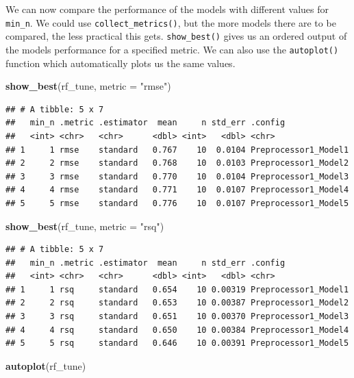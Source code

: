\documentclass[
]{book}
\newenvironment{Shaded}{\begin{snugshade}}{\end{snugshade}}
\newcommand{\AttributeTok}[1]{\textcolor[rgb]{0.13,0.29,0.53}{#1}}
\newcommand{\FunctionTok}[1]{\textcolor[rgb]{0.13,0.29,0.53}{\textbf{#1}}}
\newcommand{\NormalTok}[1]{#1}
\newcommand{\StringTok}[1]{\textcolor[rgb]{0.31,0.60,0.02}{#1}}
\begin{document}
We can now compare the performance of the models with different values for
\texttt{min\_n}. We could use \texttt{collect\_metrics()}, but the more models there are to be
compared, the less practical this gets. \texttt{show\_best()} gives us an ordered output
of the models performance for a specified metric. We can also use the
\texttt{autoplot()} function which automatically plots us the same values.

\begin{Shaded}
\begin{Highlighting}[]
\FunctionTok{show\_best}\NormalTok{(rf\_tune, }\AttributeTok{metric =} \StringTok{"rmse"}\NormalTok{)}
\end{Highlighting}
\end{Shaded}

\begin{verbatim}
## # A tibble: 5 x 7
##   min_n .metric .estimator  mean     n std_err .config             
##   <int> <chr>   <chr>      <dbl> <int>   <dbl> <chr>               
## 1     1 rmse    standard   0.767    10  0.0104 Preprocessor1_Model1
## 2     2 rmse    standard   0.768    10  0.0103 Preprocessor1_Model2
## 3     3 rmse    standard   0.770    10  0.0104 Preprocessor1_Model3
## 4     4 rmse    standard   0.771    10  0.0107 Preprocessor1_Model4
## 5     5 rmse    standard   0.776    10  0.0107 Preprocessor1_Model5
\end{verbatim}

\begin{Shaded}
\begin{Highlighting}[]
\FunctionTok{show\_best}\NormalTok{(rf\_tune, }\AttributeTok{metric =} \StringTok{"rsq"}\NormalTok{)}
\end{Highlighting}
\end{Shaded}

\begin{verbatim}
## # A tibble: 5 x 7
##   min_n .metric .estimator  mean     n std_err .config             
##   <int> <chr>   <chr>      <dbl> <int>   <dbl> <chr>               
## 1     1 rsq     standard   0.654    10 0.00319 Preprocessor1_Model1
## 2     2 rsq     standard   0.653    10 0.00387 Preprocessor1_Model2
## 3     3 rsq     standard   0.651    10 0.00370 Preprocessor1_Model3
## 4     4 rsq     standard   0.650    10 0.00384 Preprocessor1_Model4
## 5     5 rsq     standard   0.646    10 0.00391 Preprocessor1_Model5
\end{verbatim}

\begin{Shaded}
\begin{Highlighting}[]
\FunctionTok{autoplot}\NormalTok{(rf\_tune)}
\end{Highlighting}
\end{Shaded}
\end{document}
